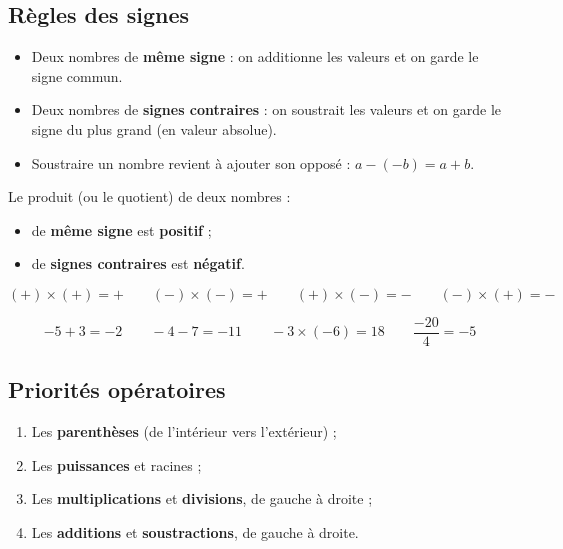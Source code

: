 \documentclass[a4paper,11pt]{article}
\begin{document}
\subsection{Règles des signes}

\begin{theoreme}
\begin{itemize}
  \item Deux nombres de \textbf{même signe} : on additionne les valeurs et on garde le signe commun.
  \item Deux nombres de \textbf{signes contraires} : on soustrait les valeurs et on garde le signe du plus grand (en valeur absolue).
  \item Soustraire un nombre revient à ajouter son opposé : $a - (-b) = a + b$.
\end{itemize}
\end{theoreme}

\begin{theoreme}
Le produit (ou le quotient) de deux nombres :
\begin{itemize}
  \item de \textbf{même signe} est \textbf{positif} ;
  \item de \textbf{signes contraires} est \textbf{négatif}.
\end{itemize}
\[
(+)\times(+) = + \qquad (-)\times(-) = + \qquad (+)\times(-) = - \qquad (-)\times(+) = -
\]
\end{theoreme}

\begin{exemple}[-- Calculs]
\[
-5 + 3 = -2 \qquad -4 - 7 = -11 \qquad -3 \times (-6) = 18 \qquad \frac{-20}{4} = -5
\]
\end{exemple}

\subsection{Priorités opératoires}

\begin{methode}
\begin{enumerate}
  \item Les \textbf{parenthèses} (de l'intérieur vers l'extérieur) ;
  \item Les \textbf{puissances} et racines ;
  \item Les \textbf{multiplications} et \textbf{divisions}, de gauche à droite ;
  \item Les \textbf{additions} et \textbf{soustractions}, de gauche à droite.
\end{enumerate}
\end{methode}
\end{document}
